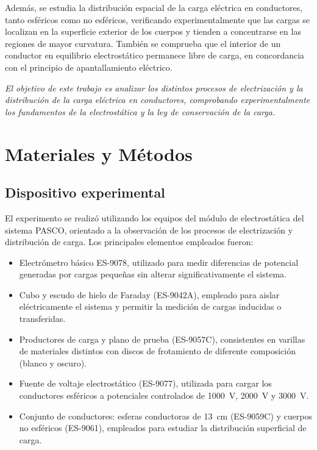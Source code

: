 \documentclass[12pt,a4paper]{article}
\begin{document}
Además, se estudia la distribución espacial de la carga eléctrica en conductores, tanto esféricos como no esféricos, verificando experimentalmente que las cargas se localizan en la superficie exterior de los cuerpos y tienden a concentrarse en las regiones de mayor curvatura. También se comprueba que el interior de un conductor en equilibrio electrostático permanece libre de carga, en concordancia con el principio de apantallamiento eléctrico.

\textit{El objetivo de este trabajo es analizar los distintos procesos de electrización y la distribución de la carga eléctrica en conductores, comprobando experimentalmente los fundamentos de la electrostática y la ley de conservación de la carga.}


\section{Materiales y Métodos}

\subsection{Dispositivo experimental}
El experimento se realizó utilizando los equipos del módulo de electrostática del sistema PASCO, orientado a la observación de los procesos de electrización y distribución de carga. Los principales elementos empleados fueron:

\begin{itemize}
    \item Electrómetro básico ES-9078, utilizado para medir diferencias de potencial generadas por cargas pequeñas sin alterar significativamente el sistema.
    \item Cubo y escudo de hielo de Faraday (ES-9042A), empleado para aislar eléctricamente el sistema y permitir la medición de cargas inducidas o transferidas.
    \item Productores de carga y plano de prueba (ES-9057C), consistentes en varillas de materiales distintos con discos de frotamiento de diferente composición (blanco y oscuro).
    \item Fuente de voltaje electrostático (ES-9077), utilizada para cargar los conductores esféricos a potenciales controlados de \SI{1000}{V}, \SI{2000}{V} y \SI{3000}{V}.
    \item Conjunto de conductores: esferas conductoras de \SI{13}{cm} (ES-9059C) y cuerpos no esféricos (ES-9061), empleados para estudiar la distribución superficial de carga.
\end{itemize}
\end{document}
